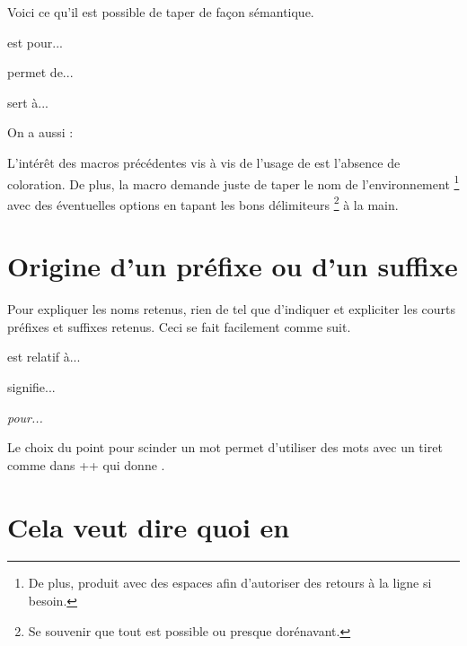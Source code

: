 \documentclass[10pt, a4paper]{article}
\begin{document}
Voici ce qu'il est possible de taper de façon sémantique.

\begin{bdoclatex}[sbs]
 est pour...

 permet de...

 sert à...

On a aussi :

\end{bdoclatex}


\begin{bdocrem}
    L'intérêt des macros précédentes vis à vis de l'usage de  est l'absence de coloration.
    De plus, la macro  demande juste de taper le nom de l'environnement
    \footnote{
        De plus,  produit  avec des espaces afin d'autoriser des retours à la ligne si besoin.
    }
    avec des éventuelles options en tapant les bons délimiteurs
    \footnote{
        Se souvenir que tout est possible ou presque dorénavant.
    }
    à la main.
\end{bdocrem}




\section{Origine d'un préfixe ou d'un suffixe}

Pour expliquer les noms retenus, rien de tel que d'indiquer et expliciter les courts préfixes et suffixes retenus. Ceci se fait facilement comme suit.

\begin{bdoclatex}[sbs]
 est relatif à...

 signifie...

\emph{ pour...}
\end{bdoclatex}


\begin{bdocrem}
    Le choix du point pour scinder un mot permet d'utiliser des mots avec un tiret comme dans \bdocinlatex++ qui donne .
\end{bdocrem}


\section{Cela veut dire quoi en }
\end{document}
